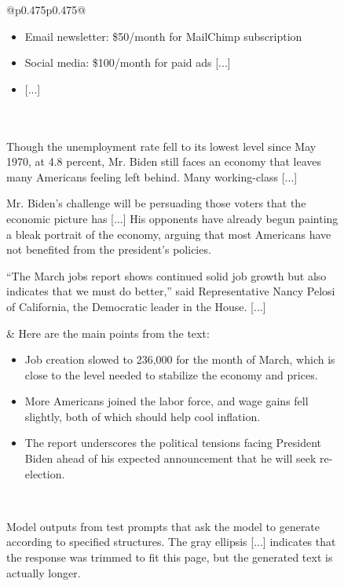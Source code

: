\documentclass{article}
\begin{document}
\begin{figure}[p]
\begin{tabular}{@{}p{}p{}@{}}
    \begin{itemize}[leftmargin=8pt]
        \item Email newsletter: \$50/month for MailChimp subscription
        \item Social media: \$100/month for paid ads
        \textcolor[HTML]{808080}{[...]}
        \item \textcolor[HTML]{808080}{[...]}
    \end{itemize}\\
    \midrule
    \\
    \midrule
    Though the unemployment rate fell to its lowest level since May 1970, at 4.8 percent, Mr. Biden still faces an economy that leaves many Americans feeling left behind. Many working-class \textcolor[HTML]{808080}{[...]}
    
    Mr. Biden’s challenge will be persuading those voters that the economic picture has \textcolor[HTML]{808080}{[...]} His opponents have already begun painting a bleak portrait of the economy, arguing that most Americans have not benefited from the president’s policies.
    
    “The March jobs report shows continued solid job growth but also indicates that we must do better,” said Representative Nancy Pelosi of California, the Democratic leader in the House. \textcolor[HTML]{808080}{[...]}
    
     &
     Here are the main points from the text:
     \begin{itemize}[leftmargin=8pt]
\item Job creation slowed to 236,000 for the month of March, which is close to the level needed to stabilize the economy and prices.
\item More Americans joined the labor force, and wage gains fell slightly, both of which should help cool inflation.
\item The report underscores the political tensions facing President Biden ahead of his expected announcement that he will seek re-election.
\end{itemize}\\
    \bottomrule
    \end{tabular}
    \caption{Model outputs from test prompts that ask the model to generate according to specified structures. The gray ellipsis \textcolor[HTML]{808080}{[...]} indicates that the response was trimmed to fit this page, but the generated text is actually longer.}
    \label{fig:structure_examples}
    
\end{figure}
\end{document}
